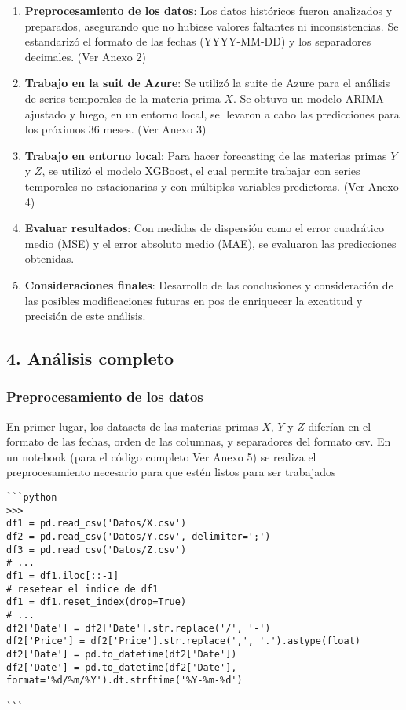 \begin{enumerate}
\def\labelenumi{\arabic{enumi}.}
\tightlist
\item
  \textbf{Preprocesamiento de los datos}: Los datos históricos fueron
  analizados y preparados, asegurando que no hubiese valores faltantes
  ni inconsistencias. Se estandarizó el formato de las fechas
  (YYYY-MM-DD) y los separadores decimales. (Ver Anexo 2)
\item
  \textbf{Trabajo en la suit de Azure}: Se utilizó la suite de Azure
  para el análisis de series temporales de la materia prima \(X\). Se
  obtuvo un modelo ARIMA ajustado y luego, en un entorno local, se
  llevaron a cabo las predicciones para los próximos 36 meses. (Ver
  Anexo 3)
\item
  \textbf{Trabajo en entorno local}: Para hacer forecasting de las
  materias primas \(Y\) y \(Z\), se utilizó el modelo XGBoost, el cual
  permite trabajar con series temporales no estacionarias y con
  múltiples variables predictoras. (Ver Anexo 4)
\item
  \textbf{Evaluar resultados}: Con medidas de dispersión como el error
  cuadrático medio (MSE) y el error absoluto medio (MAE), se evaluaron
  las predicciones obtenidas.
\item
  \textbf{Consideraciones finales}: Desarrollo de las conclusiones y
  consideración de las posibles modificaciones futuras en pos de
  enriquecer la excatitud y precisión de este análisis.
\end{enumerate}

\subsection{4. Análisis completo}\label{anuxe1lisis-completo}

\subsubsection{Preprocesamiento de los
datos}\label{preprocesamiento-de-los-datos}

En primer lugar, los datasets de las materias primas \(X\), \(Y\) y
\(Z\) diferían en el formato de las fechas, orden de las columnas, y
separadores del formato csv. En un notebook (para el código completo Ver
Anexo 5) se realiza el preprocesamiento necesario para que estén listos
para ser trabajados

\begin{verbatim}
```python
>>>
df1 = pd.read_csv('Datos/X.csv')
df2 = pd.read_csv('Datos/Y.csv', delimiter=';')
df3 = pd.read_csv('Datos/Z.csv')
# ...
df1 = df1.iloc[::-1]
# resetear el indice de df1
df1 = df1.reset_index(drop=True)
# ...
df2['Date'] = df2['Date'].str.replace('/', '-')
df2['Price'] = df2['Price'].str.replace(',', '.').astype(float)
df2['Date'] = pd.to_datetime(df2['Date'])
df2['Date'] = pd.to_datetime(df2['Date'], format='%d/%m/%Y').dt.strftime('%Y-%m-%d')

```
\end{verbatim}

